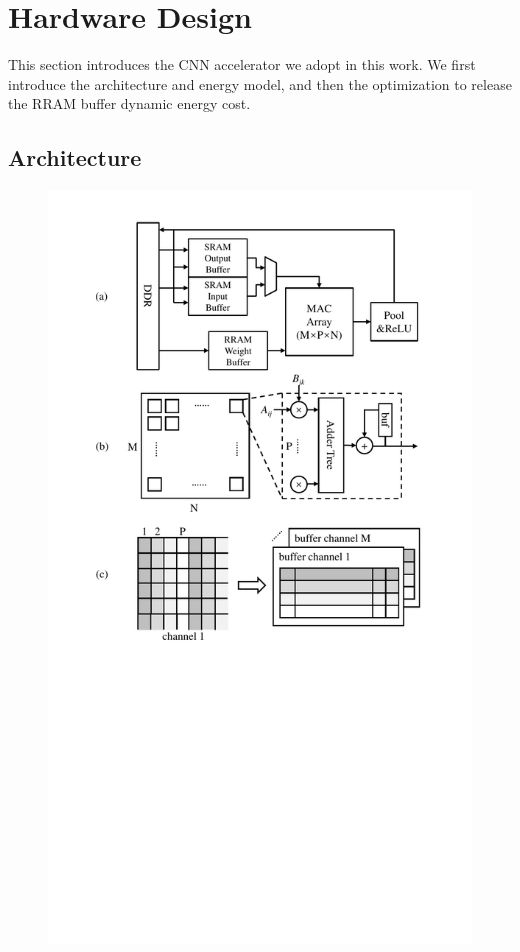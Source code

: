 \section{Hardware Design}\label{sec:hw}
This section introduces the CNN accelerator we adopt in this work. We first introduce the architecture and energy model, and then the optimization to release the RRAM buffer dynamic energy cost.

\subsection{Architecture}\label{sec:hw:arch}

\begin{figure}[t]
  \centering
  \includegraphics[width=1\columnwidth]{fig/arch.pdf}

\end{figure}
